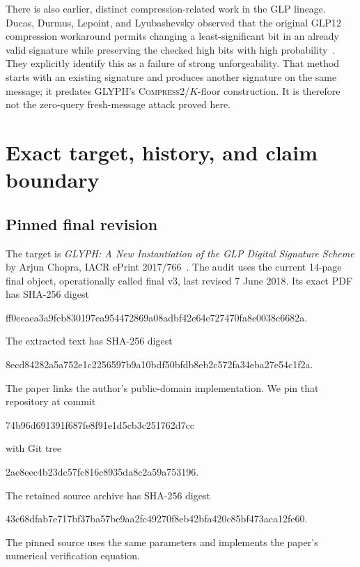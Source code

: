 \documentclass[10pt,a4paper]{article}
\begin{document}
There is also earlier, distinct compression-related work in the GLP lineage.
Ducas, Durmus, Lepoint, and Lyubashevsky observed that the original GLP12
compression workaround permits changing a least-significant bit in an
already valid signature while preserving the checked high bits with high
probability~\cite{ddll}.  They explicitly identify this as a failure of
strong unforgeability.  That method starts with an existing signature and
produces another signature on the same message; it predates GLYPH's
\textsc{Compress2}/$K$-floor construction.  It is therefore not the
zero-query fresh-message attack proved here.

\section{Exact target, history, and claim boundary}

\subsection{Pinned final revision}

The target is \emph{GLYPH: A New Instantiation of the GLP Digital Signature
Scheme} by Arjun Chopra, IACR ePrint 2017/766~\cite{glyph}.  The audit uses
the current 14-page final object, operationally called final v3, last revised
7 June 2018.  Its exact PDF has SHA-256 digest
\begin{center}
\small\ttfamily
ff0eeaea3a9fcb830197ea954472869a08adbf42e64e727470fa8e0038c6682a.
\end{center}
The extracted text has SHA-256 digest
\begin{center}
\small\ttfamily
8ecd84282a5a752e1c2256597b9a10bdf50bfdb8eb2c572fa34eba27e54c1f2a.
\end{center}

The paper links the author's public-domain implementation.  We pin that
repository at commit
\begin{center}
\small\ttfamily
74b96d691391f687fe8f91e1d5cb3c251762d7cc
\end{center}
with Git tree
\begin{center}
\small\ttfamily
2ae8eec4b23dc57fc816c8935da8c2a59a753196.
\end{center}
The retained source archive has SHA-256 digest
\begin{center}
\small\ttfamily
43c68dfab7e717bf37ba57be9aa2fc49270f8eb42bfa420c85bf473aca12fe60.
\end{center}
The pinned source uses the same parameters and implements the paper's
numerical verification equation.
\end{document}
